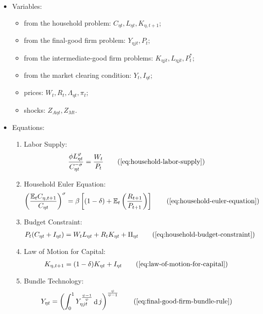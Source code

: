 \documentclass[
	12pt,
	]{article}
\numberwithin{equation}{section}
\DeclareMathOperator{\dif}{d}
\theoremstyle{definition}
\theoremstyle{plain}
\theoremstyle{plain}
\theoremstyle{plain}
\begin{document}
{\singlespacing
	
	\begin{itemize}
		\item Variables:
		
		\begin{itemize}
			\item from the household problem: $C_{\eta t}, L_{\eta t}, K_{\eta, t+1}$;
			\item from the final-good firm problem: $Y_{\eta jt}, P_t$;
			\item from the intermediate-good firm problems: $K_{\eta jt}, L_{\eta jt}, P_t^\ast$;
			\item from the market clearing condition: $Y_t, I_{\eta t}$;
			\item prices: $W_t, R_t, \Lambda_{\eta t}, \pi_t$;
			\item shocks: $Z_{A\eta t}, Z_{Mt}$.
		\end{itemize}
		\item Equations:
		
		\begin{enumerate}
			\item Labor Supply:
			\begin{align}
				\frac{\phi L_{\eta t}^{\varphi}}{C_{\eta t}^{-\sigma}} = \frac{W_t}{P_t}
				\tag{\ref{eq:household-labor-supply}}
			\end{align}
			
			\item Household Euler Equation:
			\begin{align}
				\left( \frac{\mathbb{E}_t C_{\eta, t+1}}{C_{\eta t}} \right)^\sigma = \beta \left[ (1-\delta) + \mathbb{E}_t \left(\frac{R_{t+1}}{P_{t+1}}\right) \right]
				\tag{\ref{eq:household-euler-equation}}
			\end{align}
			
			\item Budget Constraint: 
			\begin{align}
				P_t (C_{\eta t} + I_{\eta t}) = W_t L_{\eta t} + R_t K_{\eta t} + {\Pi}_{\eta t}
				\tag{\ref{eq:household-budget-constraint}}
			\end{align}
			
			\item Law of Motion for Capital:
			\begin{align}
				K_{\eta, t+1} = (1-\delta)K_{\eta t} + I_{\eta t}
				\tag{\ref{eq:law-of-motion-for-capital}}
			\end{align}
			
			\item Bundle Technology:
			\begin{align}
				Y_{\eta t} = \left( \int_{0}^{1} Y_{\eta jt}^{\frac{\psi-1}{\psi}} \dif j \right)^{\frac{\psi}{\psi-1}}
				\tag{\ref{eq:final-good-firm-bundle-rule}}
			\end{align}
			

\end{enumerate}
\end{itemize}}
\end{document}
